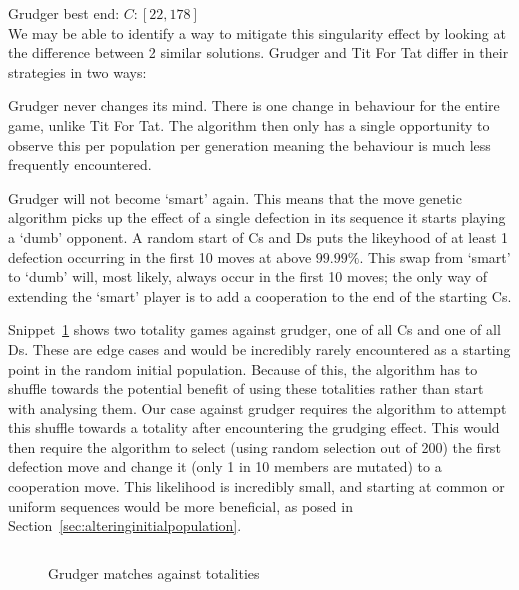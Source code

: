 Grudger best end: \(C:[22,178]\)\\

We may be able to identify a way to mitigate this singularity effect by looking at the difference between 2 similar solutions.
Grudger and Tit For Tat differ in their strategies in two ways:

\begin{itemize}
    \begin{item}
        Grudger never changes its mind.
        There is one change in behaviour for the entire game, unlike Tit For Tat.
        The algorithm then only has a single opportunity to observe this per population per generation meaning the behaviour is much less frequently encountered.
    \end{item}
    \begin{item}
        Grudger will not become `smart' again.
        This means that the move genetic algorithm picks up the effect of a single defection in its sequence it starts playing a `dumb' opponent.
        A random start of Cs and Ds puts the likeyhood of at least 1 defection occurring in the first 10 moves at above \(99.99\% \).
        This swap from `smart' to `dumb' will, most likely, always occur in the first 10 moves;
        the only way of extending the `smart' player is to add a cooperation to the end of the starting Cs.
    \end{item}
\end{itemize}

Snippet~\ref{code:gudgerTotalities} shows two totality games against grudger, one of all Cs and one of all Ds.
These are edge cases and would be incredibly rarely encountered as a starting point in the random initial population.
Because of this, the algorithm has to shuffle towards the potential benefit of using these totalities rather than start with analysing them.
Our case against grudger requires the algorithm to attempt this shuffle towards a totality after encountering the grudging effect.
This would then require the algorithm to select (using random selection out of 200) the first defection move and change it (only 1 in 10 members are mutated) to a cooperation move.
This likelihood is incredibly small, and starting at common or uniform sequences would be more beneficial, as posed in Section~\ref{sec:alteringinitialpopulation}.\\

\begin{figure}
    \inputminted{python}{code_snippets/grudgerTotalities.py}
    \caption{Grudger matches against totalities}\label{code:gudgerTotalities}
\end{figure}

